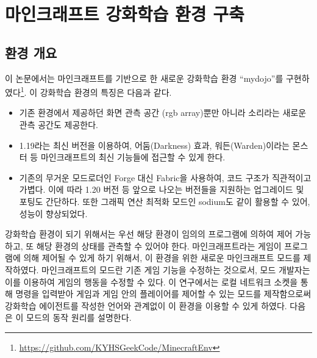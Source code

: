 \documentclass[oneside, under, ko]{snuthesis}
\begin{document}
\chapter{마인크래프트 강화학습 환경 구축}
\section{환경 개요}
이 논문에서는 마인크래프트를 기반으로 한 새로운 강화학습 환경 “mydojo”를 구현하였다\footnote{\url{https://github.com/KYHSGeekCode/MinecraftEnv}}. 이 강화학습 환경의 특징은 다음과 같다.
\begin{itemize}
    \item 기존 환경에서 제공하던 화면 관측 공간 (rgb array)뿐만 아니라 소리라는 새로운 관측 공간도 제공한다.
    \item 1.19라는 최신 버전을 이용하여, 어둠(Darkness) 효과, 워든(Warden)이라는 몬스터 등 마인크래프트의 최신 기능들에 접근할 수 있게 한다.
    \item 기존의 무거운 모드로더인 Forge 대신 Fabric을 사용하여, 코드 구조가 직관적이고 가볍다. 이에 따라 1.20 버전 등 앞으로 나오는 버전들을 지원하는 업그레이드 및 포팅도 간단하다. 또한 그래픽 연산 최적화 모드인 sodium도 같이 활용할 수 있어, 성능이 향상되었다.
\end{itemize}
강화학습 환경이 되기 위해서는 우선 해당 환경이 임의의 프로그램에 의하여 제어 가능하고, 또 해당 환경의 상태를 관측할 수 있어야 한다. 마인크래프트라는 게임이 프로그램에 의해 제어될 수 있게 하기 위해서, 이 환경을 위한 새로운 마인크래프트 모드를 제작하였다. 마인크래프트의 모드란 기존 게임 기능을 수정하는 것으로서, 모드 개발자는 이를 이용하여 게임의 행동을 수정할 수 있다. 이 연구에서는 로컬 네트워크 소켓을 통해 명령을 입력받아 게임과 게임 안의 플레이어를 제어할 수 있는 모드를 제작함으로써 강화학습 에이전트를 작성한 언어와 관계없이 이 환경을 이용할 수 있게 하였다.
다음은 이 모드의 동작 원리를 설명한다.
\end{document}
